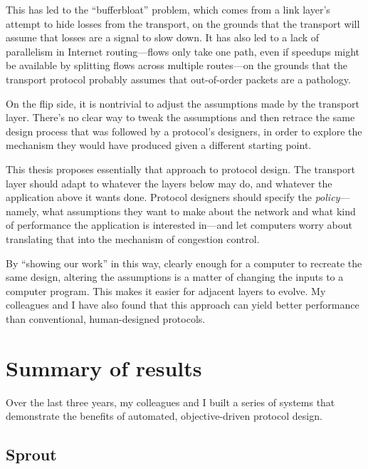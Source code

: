 This has led to the ``bufferbloat''\cite{bufferbloat} problem, which
comes from a link layer's attempt to hide losses from the transport,
on the grounds that the transport will assume that losses are a signal
to slow down. It has also led to a lack of parallelism in Internet
routing---flows only take one path, even if speedups might be
available by splitting flows across multiple routes---on the grounds
that the transport protocol probably assumes that out-of-order packets
are a pathology.

On the flip side, it is nontrivial to adjust the assumptions made by
the transport layer. There's no clear way to tweak the assumptions and
then retrace the same design process that was followed by a protocol's
designers, in order to explore the mechanism they would have produced
given a different starting point.


This thesis proposes essentially that approach to protocol design. The
transport layer should adapt to whatever the layers below may do, and
whatever the application above it wants done. Protocol designers
should specify the \emph{policy}---namely, what assumptions they want
to make about the network and what kind of performance the application
is interested in---and let computers worry about translating that into
the mechanism of congestion control.

By ``showing our work'' in this way, clearly enough for a computer to
recreate the same design, altering the assumptions is a matter of
changing the inputs to a computer program. This makes it easier for
adjacent layers to evolve. My colleagues and I have also found that
this approach can yield better performance than conventional,
human-designed protocols.

\section{Summary of results}

Over the last three years, my colleagues and I built a series of
systems that demonstrate the benefits of automated, objective-driven
protocol design.

\subsection{Sprout}

